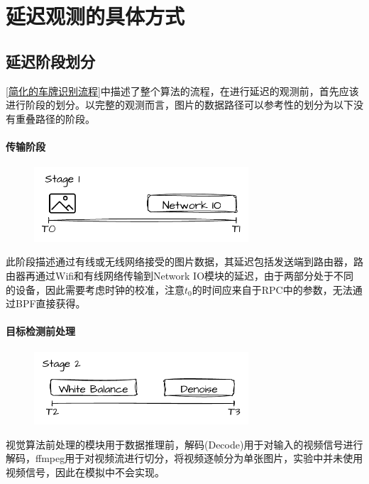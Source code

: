 \documentclass[master]{shtthesis}
\begin{document}
\section{延迟观测的具体方式}
\subsection{延迟阶段划分}
\ref{简化的车牌识别流程}中描述了整个算法的流程，在进行延迟的观测前，首先应该进行阶段的划分。以完整的观测而言，图片的数据路径可以参考性的划分为以下没有重叠路径的阶段。

\paragraph{传输阶段}
\begin{figure}[H]
	\centering
	\includegraphics[width=8cm]{img/s1.pdf}
	\label{传输阶段}
\end{figure}
此阶段描述通过有线或无线网络接受的图片数据，其延迟包括发送端到路由器，路由器再通过Wifi和有线网络传输到Network IO模块的延迟，由于两部分处于不同的设备，因此需要考虑时钟的校准，注意$t_0$的时间应来自于RPC中的参数，无法通过BPF直接获得。


\paragraph{目标检测前处理}
\begin{figure}[H]
	\centering
	\includegraphics[width=8cm]{img/s2.pdf}
	\label{目标检测前处理阶段}
\end{figure}
视觉算法前处理的模块用于数据推理前，解码(Decode)用于对输入的视频信号进行解码，ffmpeg用于对视频流进行切分，将视频逐帧分为单张图片，实验中并未使用视频信号，因此在模拟中不会实现。
\end{document}
